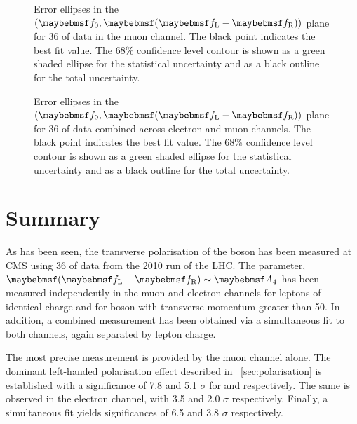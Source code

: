 \begin{figure}
\centering
{}\quad
{}
\caption{Error ellipses in the $(\f0, \fLmfR)$ plane for \unit{36}{\invpb} of
  data in the muon channel. The black point indicates the best fit
  value. The 68\% confidence level contour is shown as a green shaded ellipse
  for the statistical uncertainty and as a black outline for the total
  uncertainty.}
\label{fig:wpol_contour_mu}
\end{figure}


\begin{figure}
\centering
{}\quad
{}
\caption{Error ellipses in the $(\f0, \fLmfR)$ plane for \unit{36}{\invpb} of
  data combined across electron and muon channels. The black point indicates the
  best fit value. The 68\% confidence level contour is shown as a green shaded
  ellipse for the statistical uncertainty and as a black outline for the total
  uncertainty.}
\label{fig:wpol_contour_comb}
\end{figure}







\section{Summary}
As has been seen, the transverse polarisation of the \PW boson has been measured
at \ac{CMS} using \unit{36}{\invpb} of data from the 2010 run of the
\ac{LHC}. The parameter, $\fLmfR \sim \Afour$ has been measured independently in
the muon and electron channels for leptons of identical charge and for \PW boson
with transverse momentum greater than \unit{50}{\GeV}. In addition, a combined
measurement has been obtained via a simultaneous fit to both channels, again
separated by lepton charge.

The most precise measurement is provided by the muon channel alone. The dominant
left-handed polarisation effect described in \sec~\ref{sec:polarisation} is
established with a significance of 7.8 and 5.1 $\sigma$ for \PWp and \PWm
respectively. The same is observed in the electron channel, with 3.5 and 2.0
$\sigma$ respectively. Finally, a simultaneous fit yields significances of 6.5
and 3.8 $\sigma$ respectively.

